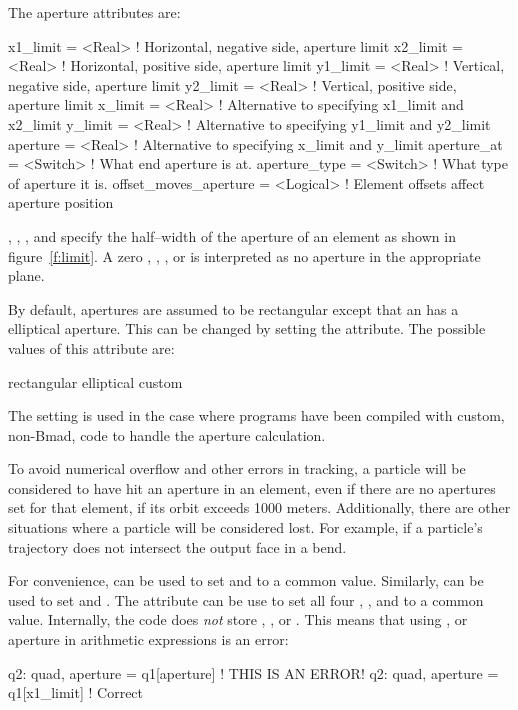 The aperture attributes are:
\begin{example}
  x1_limit      = <Real>      ! Horizontal, negative side, aperture limit
  x2_limit      = <Real>      ! Horizontal, positive side, aperture limit
  y1_limit      = <Real>      ! Vertical, negative side, aperture limit
  y2_limit      = <Real>      ! Vertical, positive side, aperture limit
  x_limit       = <Real>      ! Alternative to specifying x1_limit and x2_limit
  y_limit       = <Real>      ! Alternative to specifying y1_limit and y2_limit
  aperture      = <Real>      ! Alternative to specifying x_limit and y_limit
  aperture_at   = <Switch>    ! What end aperture is at.
  aperture_type = <Switch>    ! What type of aperture it is.
  offset_moves_aperture = <Logical> ! Element offsets affect aperture position
\end{example}
, , , and  specify
the half--width of the aperture of an element as shown in
figure~\ref{f:limit}. A zero , ,
, or  is interpreted as no aperture in the
appropriate plane.

By default, apertures are assumed to be
rectangular except that an  has a elliptical aperture.
This can be changed by setting the  attribute. The possible 
values of this attribute are:
\begin{example}
  rectangular
  elliptical
  custom
\end{example}
The  setting is used in the case where programs have been
compiled with custom, non-Bmad, code to handle the aperture calculation.

To avoid numerical overflow and other errors in tracking, a particle
will be considered to have hit an aperture in an element, even if
there are no apertures set for that element, if its orbit exceeds 1000
meters. Additionally, there are other situations where a particle will
be considered lost. For example, if a particle's trajectory does
not intersect the output face in a bend.

For convenience,  can be used to set  and
 to a common value. Similarly,  can be used
to set  and .  The  attribute
can be use to set all four , , 
and  to a common value. Internally, the \bmad code does {\em not}
store , , or . This means that
using ,  or aperture in arithmetic expressions is
an error:
\begin{example}
  q2: quad, aperture = q1[aperture]   ! THIS IS AN ERROR!
  q2: quad, aperture = q1[x1_limit]   ! Correct
\end{example}

